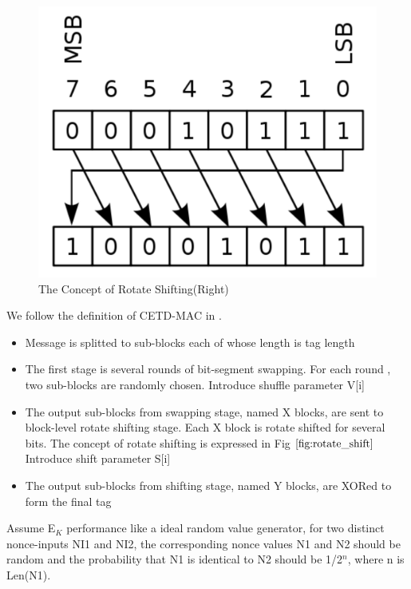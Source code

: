 \begin{figure}[htbp]
 \centering
 \includegraphics[scale=0.4]{./diagrams/rotate_right.pdf}
 \caption{The Concept of Rotate Shifting(Right)}
 \label{fig:rotate_shift}
\end{figure}
We follow the definition of CETD-MAC in \cite{cetd}. 
\begin{itemize}
	\item Message is splitted to sub-blocks each of whose length is tag length
	\item The first stage is several rounds of bit-segment swapping. For each round , two sub-blocks are randomly chosen. Introduce shuffle parameter V[i]
	\item The output sub-blocks from swapping stage, named X blocks, are sent to block-level rotate shifting stage. Each X block is rotate shifted for several bits. The concept of rotate shifting is expressed in Fig $\ref{fig:rotate_shift}$ Introduce shift parameter S[i]
	\item The output sub-blocks from shifting stage, named Y blocks, are XORed to form the final tag
\end{itemize}
Assume E$_K$ performance like a ideal random value generator, for two distinct nonce-inputs NI1 and NI2, the corresponding nonce values N1 and N2 should be random and the probability that N1 is identical to N2 should be 1/2$^n$, where n is Len(N1). 

